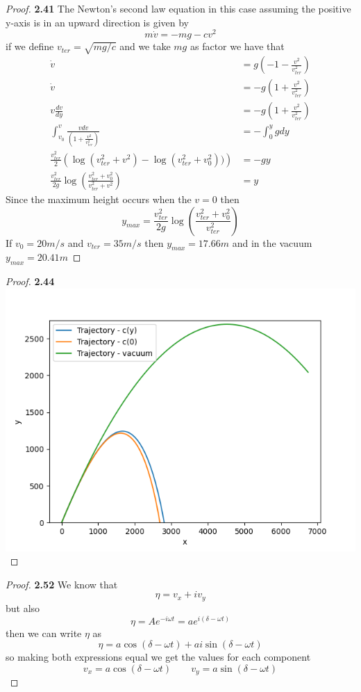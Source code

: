 \documentclass[11pt]{article}
\theoremstyle{definition}
\begin{document}
\cleardoublepage
    \begin{proof}{\textbf{2.41}}
    The Newton's second law equation in this case assuming the
    positive y-axis is in an upward direction is given by
    $$m\dot{v} = -mg - cv^2$$
    if we define $v_{ter} = \sqrt{mg/c}$ and we take $mg$ as factor we have that
    \begin{align*}
        \dot{v} &= g\left(-1 - \frac{v^2}{v_{ter}^2}\right)\\
        \dot{v} &= -g\left(1 + \frac{v^2}{v_{ter}^2}\right)\\
        v\frac{dv}{dy} &= -g\left(1 + \frac{v^2}{v_{ter}^2}\right)\\
        \int_{v_0}^v\frac{vdv}{\left(1 + \frac{v^2}{v_{ter}^2}\right)}
            &= -\int_{0}^ygdy\\
        \frac{v_{ter}^2}{2}\left(\log(v_{ter}^2 + v^2) - \log(v_{ter}^2 + v_0^2))\right)
            &= -gy\\
        \frac{v_{ter}^2}{2g}\log\left(\frac{v_{ter}^2 + v_0^2}{v_{ter}^2 + v^2}\right)
            &= y 
    \end{align*}
    Since the maximum height occurs when the $v=0$ then
    $$y_{max} =\frac{v_{ter}^2}{2g}\log\left(\frac{v_{ter}^2 + v_0^2}{v_{ter}^2}\right)$$
    If $v_0 = 20 \si{m/s}$ and $v_{ter} = 35 \si{m/s}$ then
    $y_{max} = 17.66 \si{m}$ and in the vacuum $y_{max} = 20.41 \si{m}$     
    \end{proof}
\cleardoublepage
    \begin{proof}{\textbf{2.44}}\\
        \includegraphics{taylor-2.44.png}
    \end{proof}
    \begin{proof}{\textbf{2.52}}
        We know that
        $$\eta = v_x + iv_y$$ but also 
        $$\eta = Ae^{-i\omega t} = ae^{i(\delta - \omega t)}$$
        then we can write $\eta$ as
        $$\eta = a\cos(\delta - \omega t) + ai \sin(\delta - \omega t)$$
        so making both expressions equal we get the values for each component
        $$v_x = a\cos(\delta - \omega t) \quad\quad v_y = a\sin(\delta - \omega t)$$
    \end{proof}
\end{document}
